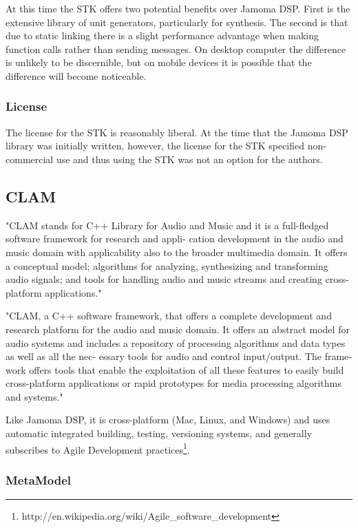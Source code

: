 \documentclass[twoside,10pt]{article}
\begin{document}
At this time the STK offers two potential benefits over Jamoma DSP.  First is the extensive library of unit generators, particularly for synthesis.  The second is that due to static linking there is a slight performance advantage when making function calls rather than sending messages.  On desktop computer the difference is unlikely to be discernible, but on mobile devices it is possible that the difference will become noticeable.

\subsubsection{License}
The license for the STK is reasonably liberal.  At the time that the Jamoma DSP library was initially written, however, the license for the STK specified non-commercial use and thus using the STK was not an option for the authors.  




\subsection{CLAM} %

"CLAM stands for C++ Library for Audio and Music and it is a full-fledged software framework for research and appli- cation development in the audio and music domain with applicability also to the broader multimedia domain.   It offers a conceptual model; algorithms for analyzing, synthesizing and transforming audio signals; and tools for handling audio and music streams and creating cross-platform applications."

"CLAM, a C++ software framework, that offers a complete development and research platform for the audio and music domain. It offers an abstract model for audio systems and includes a repository of processing algorithms and data types as well as all the nec- essary tools for audio and control input/output. The frame- work offers tools that enable the exploitation of all these features to easily build cross-platform applications or rapid prototypes for media processing algorithms and systems." \cite{Amatraian:2008}

Like Jamoma DSP, it is cross-platform (Mac, Linux, and Windows) and uses automatic integrated building, testing, versioning systems, and generally subscribes to Agile Development practices\footnote{http://en.wikipedia.org/wiki/Agile_software_development}.  

\subsubsection{MetaModel}
\end{document}
